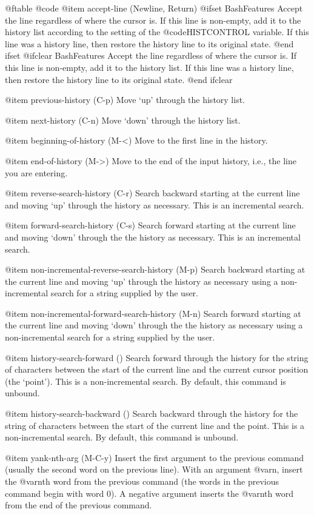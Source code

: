 {{@ftable @code
@item accept-line (Newline, Return)
@ifset BashFeatures
Accept the line regardless of where the cursor is.  If this line is
non-empty, add it to the history list according to the setting of
the @code{HISTCONTROL} variable.  If this line was a history
line, then restore the history line to its original state.
@end ifset
@ifclear BashFeatures
Accept the line regardless of where the cursor is.  If this line is
non-empty, add it to the history list.  If this line was a history
line, then restore the history line to its original state.
@end ifclear

@item previous-history (C-p)
Move `up' through the history list.

@item next-history (C-n)
Move `down' through the history list.

@item beginning-of-history (M-<)
Move to the first line in the history.

@item end-of-history (M->)
Move to the end of the input history, i.e., the line you are entering.

@item reverse-search-history (C-r)
Search backward starting at the current line and moving `up' through
the history as necessary.  This is an incremental search.

@item forward-search-history (C-s)
Search forward starting at the current line and moving `down' through
the the history as necessary.  This is an incremental search.

@item non-incremental-reverse-search-history (M-p)
Search backward starting at the current line and moving `up'
through the history as necessary using a non-incremental search
for a string supplied by the user.

@item non-incremental-forward-search-history (M-n)
Search forward starting at the current line and moving `down'
through the the history as necessary using a non-incremental search
for a string supplied by the user.

@item history-search-forward ()
Search forward through the history for the string of characters
between the start of the current line and the current cursor
position (the `point').  This is a non-incremental search.  By
default, this command is unbound.

@item history-search-backward ()
Search backward through the history for the string of characters
between the start of the current line and the point.  This
is a non-incremental search.  By default, this command is unbound.

@item yank-nth-arg (M-C-y)
Insert the first argument to the previous command (usually
the second word on the previous line).  With an argument @var{n},
insert the @var{n}th word from the previous command (the words
in the previous command begin with word 0).  A negative argument
inserts the @var{n}th word from the end of the previous command.

}}
